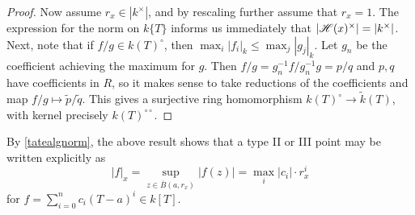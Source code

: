\begin{proof}
    Now assume $r_x \in |k^\times|$, and by rescaling further assume that $r_x = 1$. The expression for the norm on $k\{T\}$ informs us immediately that $|\mathscr{H}(x)^{\times}| = |k^\times|$. Next, note that if $f/g \in k(T)^{\circ}$, then $\max_{i} |f_i|_k \leq \max_{j} |g_j|_k$. Let $g_n$ be the coefficient achieving the maximum for $g$. 
    Then $f/g = g_n^{-1}f/g_n^{-1}g = p/q$ and $p, q$ have coefficients in $R$, so it makes sense to take reductions of the coefficients and map $f/g \mapsto \tilde{p}/\tilde{q}$. 
    This gives a surjective ring homomorphism $k(T)^{\circ} \to \tilde{k}(T)$, with kernel precisely $k(T)^{\circ\circ}$.    
\end{proof}

By \cref{tatealgnorm}, the above result shows that a type II or III point may be written explicitly as
\[
 |f|_x = \sup_{z \in \overline{B}(a, r_x)} |f(z)| = \max_{i} |c_i| \cdot r_x^i
\]
for $f = \sum\limits_{i = 0}^{n} c_i (T - a)^i \in k[T]$.


